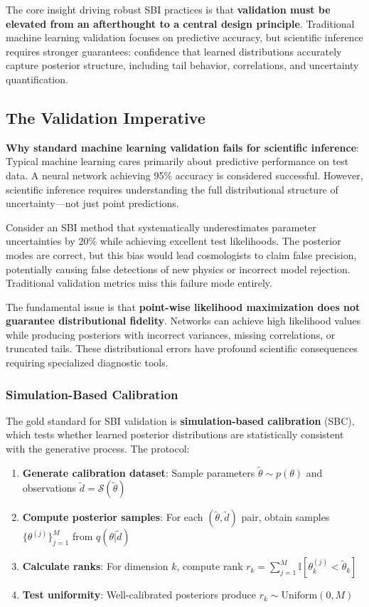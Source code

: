 \documentclass{SciPost}
\begin{document}
The core insight driving robust SBI practices is that \textbf{validation must be elevated from an afterthought to a central design principle}. Traditional machine learning validation focuses on predictive accuracy, but scientific inference requires stronger guarantees: confidence that learned distributions accurately capture posterior structure, including tail behavior, correlations, and uncertainty quantification.

\subsection{The Validation Imperative}

\textbf{Why standard machine learning validation fails for scientific inference}: Typical machine learning cares primarily about predictive performance on test data. A neural network achieving 95\% accuracy is considered successful. However, scientific inference requires understanding the full distributional structure of uncertainty—not just point predictions.

Consider an SBI method that systematically underestimates parameter uncertainties by 20\% while achieving excellent test likelihoods. The posterior modes are correct, but this bias would lead cosmologists to claim false precision, potentially causing false detections of new physics or incorrect model rejection. Traditional validation metrics miss this failure mode entirely.

The fundamental issue is that \textbf{point-wise likelihood maximization does not guarantee distributional fidelity}. Networks can achieve high likelihood values while producing posteriors with incorrect variances, missing correlations, or truncated tails. These distributional errors have profound scientific consequences requiring specialized diagnostic tools.

\subsubsection{Simulation-Based Calibration}

The gold standard for SBI validation is \textbf{simulation-based calibration} (SBC), which tests whether learned posterior distributions are statistically consistent with the generative process. The protocol:

\begin{enumerate}
    \item \textbf{Generate calibration dataset}: Sample parameters $\tilde{\theta} \sim p(\theta)$ and observations $\tilde{d} = \mathcal{S}(\tilde{\theta})$
    \item \textbf{Compute posterior samples}: For each $(\tilde{\theta}, \tilde{d})$ pair, obtain samples $\{\theta^{(j)}\}_{j=1}^M$ from $q(\theta|\tilde{d})$
    \item \textbf{Calculate ranks}: For dimension $k$, compute rank $r_k = \sum_{j=1}^M \mathbb{I}[\theta^{(j)}_k < \tilde{\theta}_k]$
    \item \textbf{Test uniformity}: Well-calibrated posteriors produce $r_k \sim \text{Uniform}(0, M)$
\end{enumerate}
\end{document}
